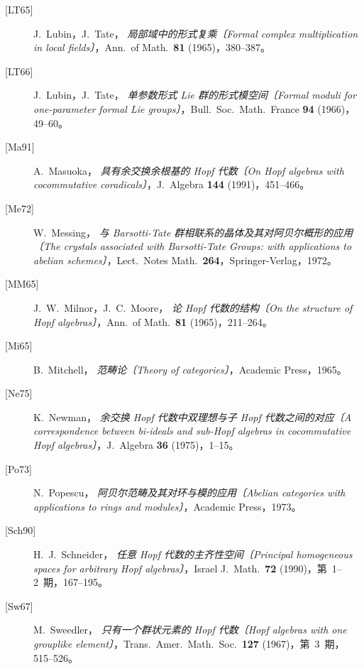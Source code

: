 \begin{description}
  \item[\textup{[LT65]}] J.~Lubin，J.~Tate，
  \emph{局部域中的形式复乘〔Formal complex multiplication in local fields〕}，Ann.\ of Math.\ \textbf{81} (1965)，380--387。

  \item[\textup{[LT66]}] J.~Lubin，J.~Tate，
  \emph{单参数形式 Lie 群的形式模空间〔Formal moduli for one-parameter formal Lie groups〕}，Bull.\ Soc.\ Math.\ France \textbf{94} (1966)，49--60。

  \item[\textup{[Ma91]}] A.~Masuoka，
  \emph{具有余交换余根基的 Hopf 代数〔On Hopf algebras with cocommutative coradicals〕}，J.\ Algebra \textbf{144} (1991)，451--466。

  \item[\textup{[Me72]}] W.~Messing，
  \emph{与 Barsotti-Tate 群相联系的晶体及其对阿贝尔概形的应用〔The crystals associated with Barsotti-Tate Groups: with applications to abelian schemes〕}，Lect.\ Notes Math.\ \textbf{264}，Springer-Verlag，1972。

  \item[\textup{[MM65]}] J.~W.~Milnor，J.~C.~Moore，
  \emph{论 Hopf 代数的结构〔On the structure of Hopf algebras〕}，Ann.\ of Math.\ \textbf{81} (1965)，211--264。

  \item[\textup{[Mi65]}] B.~Mitchell，
  \emph{范畴论〔Theory of categories〕}，Academic Press，1965。

  \item[\textup{[Ne75]}] K.~Newman，
  \emph{余交换 Hopf 代数中双理想与子 Hopf 代数之间的对应〔A correspondence between bi-ideals and sub-Hopf algebras in cocommutative Hopf algebras〕}，J.\ Algebra \textbf{36} (1975)，1--15。

  \item[\textup{[Po73]}] N.~Popescu，
  \emph{阿贝尔范畴及其对环与模的应用〔Abelian categories with applications to rings and modules〕}，Academic Press，1973。

  \item[\textup{[Sch90]}] H.~J.~Schneider，
  \emph{任意 Hopf 代数的主齐性空间〔Principal homogeneous spaces for arbitrary Hopf algebras〕}，Israel J.\ Math.\ \textbf{72} (1990)，第~1--2~期，167--195。

  \item[\textup{[Sw67]}] M.~Sweedler，
  \emph{只有一个群状元素的 Hopf 代数〔Hopf algebras with one grouplike element〕}，Trans.\ Amer.\ Math.\ Soc.\ \textbf{127} (1967)，第~3~期，515--526。


\end{description}
